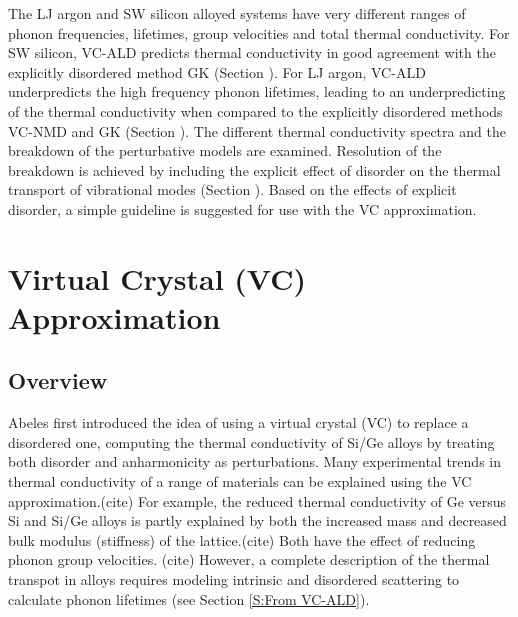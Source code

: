 \documentclass[aps,prb,onecolumn,preprint,superscriptaddress,amsmath,amssymb,floatfix]{revtex4}
\begin{document}
The LJ argon and SW silicon alloyed 
systems have very different ranges of phonon frequencies, 
lifetimes, group velocities and total thermal conductivity. 
For SW silicon, 
VC-ALD predicts thermal conductivity in good agreement with the 
explicitly disordered method GK (Section ). 
For LJ argon, VC-ALD underpredicts 
the high frequency phonon lifetimes, leading to an underpredicting of 
the thermal conductivity when compared to the explicitly disordered 
methods VC-NMD and GK (Section ). 
The different thermal conductivity spectra  
and the breakdown of the perturbative models are examined. Resolution 
of the breakdown is achieved by including the explicit effect of
disorder on the thermal transport of vibrational modes (Section ). Based 
on the effects of explicit disorder, a simple guideline is suggested 
for use with the VC approximation.

\section{\label{S:Virtual Crystal}Virtual Crystal (VC) Approximation}

\subsection{\label{S:Overview}Overview}

Abeles first introduced the idea of using a virtual crystal (VC) to 
replace a disordered one, computing the
thermal conductivity of Si/Ge alloys by treating both
disorder and anharmonicity as perturbations.\cite{abeles_lattice_1963} 
Many experimental trends in thermal conductivity 
of a range of materials 
can be explained using the VC approximation.(cite) For example,
the reduced thermal conductivity of Ge versus Si and Si/Ge alloys 
is partly explained 
by both the increased mass and decreased bulk modulus (stiffness) of the 
lattice.(cite) Both have the effect of reducing phonon group velocities.
(cite) However, a complete 
description of the thermal transpot in alloys requires modeling intrinsic 
and disordered scattering to calculate phonon lifetimes 
(see Section \ref{S:From VC-ALD}).
\end{document}
